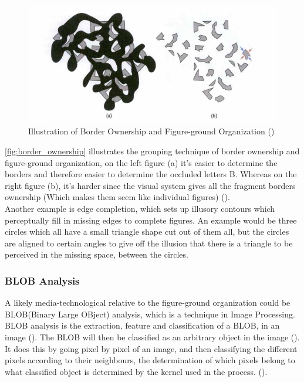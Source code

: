 \documentclass{article}
\newcommand{\goodcite}[1]{ {(\cite{#1})}}
\begin{document}
\begin{figure}[H]
    \centering
    \includegraphics[width=\textwidth]{img/b.png}
    \caption{Illustration of Border Ownership and Figure-ground Organization\goodcite{hsp}}
    \label{fig:border_ownership}
\end{figure}

\autoref{fig:border_ownership} illustrates the grouping technique of border ownership and figure-ground organization, on the left figure (a) it's easier to determine the borders and therefore easier to determine the occluded letters B. Whereas on the right figure (b), it's harder since the visual system gives all the fragment borders ownership (Which makes them seem like individual figures)\goodcite{hsp}.\medskip \\Another example is edge completion, which sets up illusory contours which perceptually fill in missing edges to complete figures. An example would be three circles which all have a small triangle shape cut out of them all, but the circles are aligned to certain angles to give off the illusion that there is a triangle to be perceived in the missing space, between the circles.\\
\subsubsection{BLOB Analysis}
A likely media-technological relative to the figure-ground organization could be BLOB(Binary Large OBject) analysis, which is a technique in Image Processing. BLOB analysis is the extraction, feature and classification of a BLOB, in an image\goodcite{IP}. The BLOB will then be classified as an arbitrary object in the image\goodcite{IP}.\\It does this by going pixel by pixel of an image, and then classifying the different pixels according to their neighbours, the determination of which pixels belong to what classified object is determined by the kernel used in the process.\goodcite{IP}.\medskip \\
\end{document}
